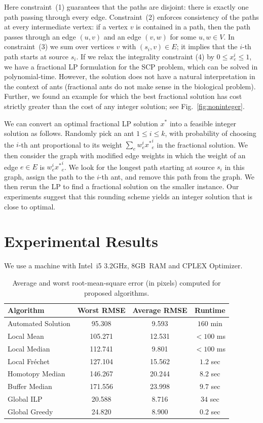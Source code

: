 \documentclass{llncs}
\newcommand{\Frechet}[0]{Fr\'{e}chet}
\newcommand{\SCoP}{\textsc{SCP}}
\begin{document}
Here constraint~(1) guarantees that the paths are
disjoint: there is exactly one path passing through every edge. Constraint~(2)
enforces consistency of the paths at
every intermediate vertex: if a vertex $v$ is contained in a path,
then the path passes through
an edge $(u,v)$ and an edge $(v,w)$ for some $u,w \in V$. In constraint~(3)
we sum over vertices $v$ with $(s_i,v)\in E$; it
implies that the $i$-th path
starts at source $s_i$.
%
If we relax the integrality constraint (4) by $0 \le x_e^i \le 1$,
we have a fractional LP formulation for the \SCoP{}
problem, which can be solved in polynomial-time. However,
the solution does not have a natural interpretation in the context of
ants (fractional ants do not make sense in the biological problem).
Further, we found an example for which the best
fractional solution has cost strictly greater than the cost of any
integer solution; see Fig.~\ref{fig:noninteger}.


We can convert an optimal fractional LP solution $x^*$ into a feasible integer solution as follows. Randomly
pick an ant $1 \le i \le k$, with probability of choosing the $i$-th
ant proportional to its weight $\sum_e w_e^i {x^*}_e^i$ in the fractional
solution. We then consider the graph with modified edge weights in which
the weight of an edge $e\in E$ is $w_e^i {x^*}_e^i$. We look for the longest path starting at source $s_i$ in this graph, assign the path to the $i$-th ant,
and remove this path from the graph. We then rerun the LP to
find a fractional solution on the smaller instance. Our experiments suggest that
this rounding scheme yields an integer solution that is close to optimal.

\section{Experimental Results}
We use a machine with Intel~i5 3.2GHz, 8GB~RAM and CPLEX Optimizer.

\begin{table}[t]
\centering
\caption{Average and worst root-mean-square error (in pixels) computed
for proposed algorithms.}
\label{tab:table2}
\medskip

\begin{tabular}{|l|c|c|c|}
\hline
Algorithm & Worst RMSE & Average RMSE & Runtime \\
\hline
Automated Solution      & 95.308    & 9.593 & $160$ min\\
Local Mean              & 105.271   & 12.531 & $<100$ ms \\
Local Median            & 112.741   & 9.801 & $<100$ ms \\
Local \Frechet{}        & 127.104    & 15.562 & $1.2$ sec \\
Homotopy Median         & 146.267   & 20.244 & $8.2$ sec \\
Buffer Median           & 171.556   & 23.998 & $9.7$ sec \\
Global ILP              & 20.588    & 8.716 & $34$ sec \\
Global Greedy           & 24.820    & 8.900 & $0.2$ sec \\
\hline
\end{tabular}
\end{table}
\end{document}
